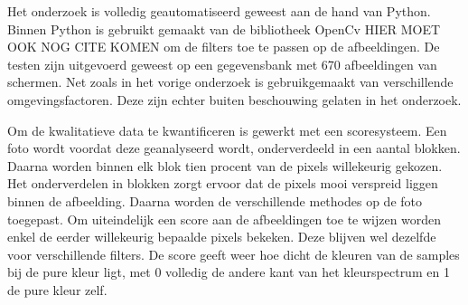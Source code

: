 Het onderzoek is volledig geautomatiseerd geweest aan de hand van Python. Binnen Python is gebruikt gemaakt van de bibliotheek OpenCv HIER MOET OOK NOG CITE KOMEN om de filters toe te passen op de afbeeldingen. De testen zijn uitgevoerd geweest op een gegevensbank met 670 afbeeldingen van schermen. Net zoals in het vorige onderzoek is gebruikgemaakt van verschillende omgevingsfactoren. Deze zijn echter buiten beschouwing gelaten in het onderzoek. 

Om de kwalitatieve data te kwantificeren is gewerkt met een scoresysteem. Een foto wordt voordat deze geanalyseerd wordt, onderverdeeld in een aantal blokken. Daarna worden binnen elk blok tien procent van de pixels willekeurig gekozen. Het onderverdelen in blokken zorgt ervoor dat de pixels mooi verspreid liggen binnen de afbeelding. Daarna worden de verschillende methodes op de foto toegepast. Om uiteindelijk een score aan de afbeeldingen toe te wijzen worden enkel de eerder willekeurig bepaalde pixels bekeken. Deze blijven wel dezelfde voor verschillende filters. De score geeft weer hoe dicht de kleuren van de samples bij de pure kleur ligt, met 0 volledig de andere kant van het kleurspectrum en 1 de pure kleur zelf.